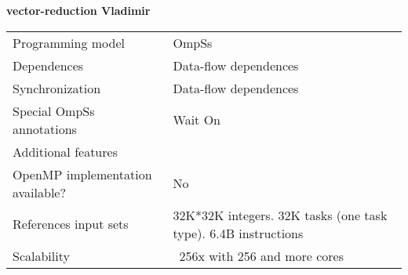 \section*{}
\label{vector-reduction_vladimir}
\centering
\Huge
\textbf{vector-reduction Vladimir}

\begin{table}[h!]
  \large
  \centering
  \begin{tabular}{|l|l|}
    \hline
    Programming model                & OmpSs \\
    Dependences                      & Data-flow dependences \\
    Synchronization                  & Data-flow dependences \\
    Special OmpSs annotations        & Wait On \\
    Additional features              &  \\
    OpenMP implementation available? & No \\
    References input sets            & 32K*32K integers. 32K tasks (one task type). 6.4B instructions \\
    Scalability                      & ~256x with 256 and more cores \\
    \hline
  \end{tabular}
\end{table}

\newpage
